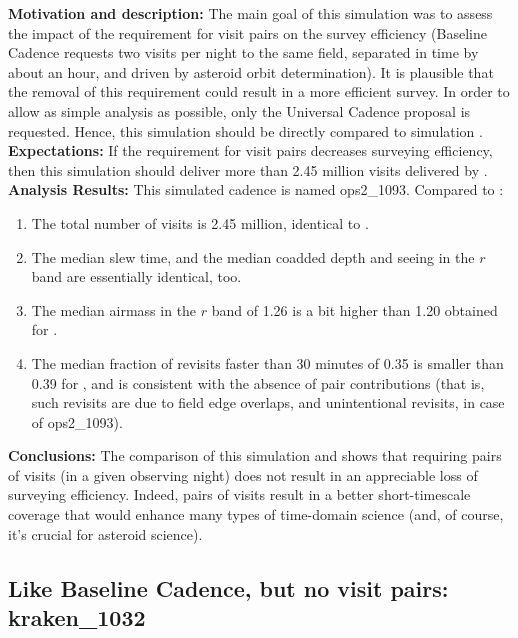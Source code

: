{\bf Motivation and description:}
The main goal of this simulation was to assess the impact of the requirement for visit pairs on the
survey efficiency (Baseline Cadence requests two visits per night to the same field, separated in time
by about an hour, and driven by asteroid orbit determination). It is plausible that the removal
of this requirement could result in a more efficient survey. In order to allow as simple analysis
as possible, only the Universal Cadence proposal is requested. Hence, this simulation
should be directly compared to simulation . \\

{\bf Expectations:} If the requirement for visit pairs decreases surveying efficiency, then
this simulation should deliver more than 2.45 million visits delivered by . \\

{\bf Analysis Results:} This simulated cadence is named ops2\_1093. Compared
to :
\begin{enumerate}
\item The total number of visits is 2.45 million, identical to .
\item The median slew time, and the median coadded depth and seeing in the $r$ band
are essentially identical, too.
\item The median airmass in the $r$ band of 1.26 is a bit higher than 1.20 obtained
for .
\item The median fraction of revisits faster than 30 minutes of 0.35 is smaller than 0.39
for , and is consistent with the absence of pair contributions (that is,
such revisits are due to field edge overlaps, and unintentional revisits, in case of ops2\_1093).
\end{enumerate}

{\bf Conclusions:}
The comparison of this simulation and  shows that requiring
pairs of visits (in a given observing night) does not result in an appreciable loss of
surveying efficiency. Indeed, pairs of visits result in a better short-timescale coverage
that would enhance many types of time-domain science (and, of course, it's crucial
for asteroid science).


\subsection{Like Baseline Cadence, but no visit pairs: kraken\_1032}


